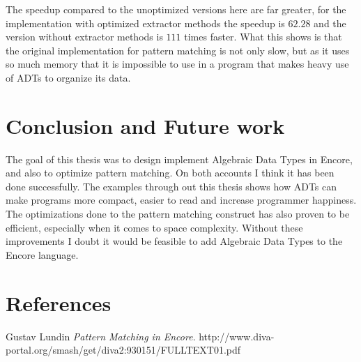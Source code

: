 \documentclass[10pt]{report}
\begin{document}
{
\par{The speedup compared to the unoptimized versions here are far greater, for the implementation with optimized extractor methods the speedup is $62.28$ and the version without extractor methods is $111$ times faster. What this shows is that the original implementation for pattern matching is not only slow, but as it uses so much memory that it is impossible to use in a program that makes heavy use of ADTs to organize its data.}

\chapter{Conclusion and Future work}
\par{The goal of this thesis was to design implement Algebraic Data Types in Encore, and also to optimize pattern matching. On both accounts I think it has been done successfully. The examples through out this thesis shows how ADTs can make programs more compact, easier to read and increase programmer happiness\cite{happy}. The optimizations done to the pattern matching construct has also proven to be efficient, especially when it comes to space complexity. Without these improvements I doubt it would be feasible to add Algebraic Data Types to the Encore language.}

\chapter{References}


\begin{thebibliography}{9}
Gustav Lundin
\textit{Pattern Matching in Encore}.
http://www.diva-portal.org/smash/get/diva2:930151/FULLTEXT01.pdf


\end{thebibliography}}
\end{document}
